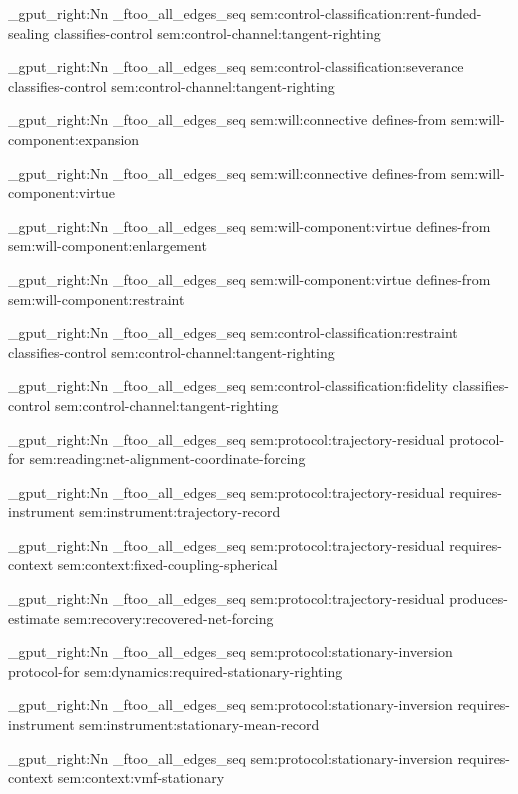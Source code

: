 \seq_gput_right:Nn \g_ftoo_all_edges_seq { { sem:control-classification:rent-funded-sealing } { classifies-control } { sem:control-channel:tangent-righting } }

\seq_gput_right:Nn \g_ftoo_all_edges_seq { { sem:control-classification:severance } { classifies-control } { sem:control-channel:tangent-righting } }

\seq_gput_right:Nn \g_ftoo_all_edges_seq { { sem:will:connective } { defines-from } { sem:will-component:expansion } }

\seq_gput_right:Nn \g_ftoo_all_edges_seq { { sem:will:connective } { defines-from } { sem:will-component:virtue } }

\seq_gput_right:Nn \g_ftoo_all_edges_seq { { sem:will-component:virtue } { defines-from } { sem:will-component:enlargement } }

\seq_gput_right:Nn \g_ftoo_all_edges_seq { { sem:will-component:virtue } { defines-from } { sem:will-component:restraint } }

\seq_gput_right:Nn \g_ftoo_all_edges_seq { { sem:control-classification:restraint } { classifies-control } { sem:control-channel:tangent-righting } }

\seq_gput_right:Nn \g_ftoo_all_edges_seq { { sem:control-classification:fidelity } { classifies-control } { sem:control-channel:tangent-righting } }

\seq_gput_right:Nn \g_ftoo_all_edges_seq { { sem:protocol:trajectory-residual } { protocol-for } { sem:reading:net-alignment-coordinate-forcing } }

\seq_gput_right:Nn \g_ftoo_all_edges_seq { { sem:protocol:trajectory-residual } { requires-instrument } { sem:instrument:trajectory-record } }

\seq_gput_right:Nn \g_ftoo_all_edges_seq { { sem:protocol:trajectory-residual } { requires-context } { sem:context:fixed-coupling-spherical } }

\seq_gput_right:Nn \g_ftoo_all_edges_seq { { sem:protocol:trajectory-residual } { produces-estimate } { sem:recovery:recovered-net-forcing } }

\seq_gput_right:Nn \g_ftoo_all_edges_seq { { sem:protocol:stationary-inversion } { protocol-for } { sem:dynamics:required-stationary-righting } }

\seq_gput_right:Nn \g_ftoo_all_edges_seq { { sem:protocol:stationary-inversion } { requires-instrument } { sem:instrument:stationary-mean-record } }

\seq_gput_right:Nn \g_ftoo_all_edges_seq { { sem:protocol:stationary-inversion } { requires-context } { sem:context:vmf-stationary } }

